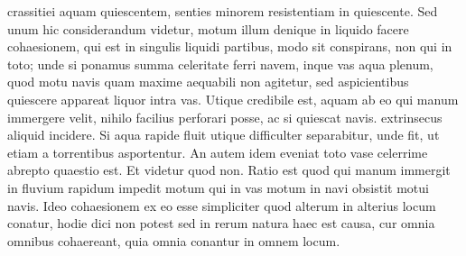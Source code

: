 crassitiei\protect{} aquam quiescentem, senties minorem resistentiam\protect{} in quiescente. Sed unum hic considerandum videtur, motum illum denique in liquido facere cohaesionem, qui est in singulis liquidi partibus, modo sit conspirans, non qui in toto; unde si ponamus summa celeritate ferri navem, inque  vas aqua plenum, quod motu navis quam maxime aequabili non agitetur, sed aspicientibus  quiescere appareat liquor intra vas. Utique credibile est, aquam ab eo qui manum immergere velit, nihilo facilius perforari posse, ac si quiescat navis.  extrinsecus aliquid incidere.
Si aqua rapide fluit utique difficulter separabitur, unde fit, ut etiam  a torrentibus asportentur. An autem idem eveniat toto vase celerrime abrepto quaestio est. Et videtur quod non. Ratio est quod qui manum immergit in fluvium rapidum impedit motum qui in vas motum in navi  obsistit motui navis. Ideo cohaesionem ex eo esse simpliciter quod alterum in alterius locum conatur, hodie dici non potest sed in rerum natura haec est causa, cur omnia omnibus cohaereant, quia omnia conantur in omnem locum.\pend
 



